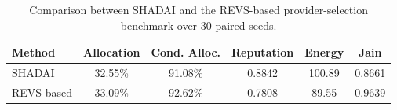 \begin{table}[t]
\centering
\caption{Comparison between SHADAI and the REVS-based provider-selection benchmark over 30 paired seeds.}
\label{tab:c24_revs}
\begin{tabular}{lccccc}
\hline
Method & Allocation & Cond. Alloc. & Reputation & Energy & Jain \\
\hline
SHADAI & 32.55\% & 91.08\% & 0.8842 & 100.89 & 0.8661 \\
REVS-based & 33.09\% & 92.62\% & 0.7808 & 89.55 & 0.9639 \\
\hline
\end{tabular}
\end{table}